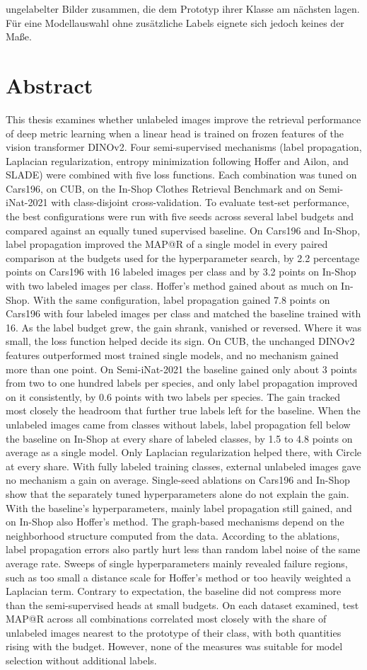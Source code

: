 ungelabelter Bilder zusammen, die dem Prototyp ihrer Klasse am nächsten lagen. Für eine Modellauswahl ohne zusätzliche Labels eignete sich jedoch keines der Maße.

\clearpage
\section*{Abstract}

This thesis examines whether unlabeled images improve the retrieval performance of deep metric learning when a linear head is trained on frozen features of the vision transformer DINOv2. Four semi-supervised mechanisms (label propagation, Laplacian regularization, entropy minimization following Hoffer and Ailon, and SLADE) were combined with five loss functions. Each combination was tuned on Cars196, on CUB, on the In-Shop Clothes Retrieval Benchmark and on Semi-iNat-2021 with class-disjoint cross-validation. To evaluate test-set performance, the best configurations were run with five seeds across several label budgets and compared against an equally tuned supervised baseline. On Cars196 and In-Shop, label propagation improved the MAP@R of a single model in every paired comparison at the budgets used for the hyperparameter search, by 2.2 percentage points on Cars196 with 16 labeled images per class and by 3.2 points on In-Shop with two labeled images per class. Hoffer's method gained about as much on In-Shop. With the same configuration, label propagation gained 7.8 points on Cars196 with four labeled images per class and matched the baseline trained with 16. As the label budget grew, the gain shrank, vanished or reversed. Where it was small, the loss function helped decide its sign. On CUB, the unchanged DINOv2 features outperformed most trained single models, and no mechanism gained more than one point. On Semi-iNat-2021 the baseline gained only about 3 points from two to one hundred labels per species, and only label propagation improved on it consistently, by 0.6 points with two labels per species. The gain tracked most closely the headroom that further true labels left for the baseline. When the unlabeled images came from classes without labels, label propagation fell below the baseline on In-Shop at every share of labeled classes, by 1.5 to 4.8 points on average as a single model. Only Laplacian regularization helped there, with Circle at every share. With fully labeled training classes, external unlabeled images gave no mechanism a gain on average. Single-seed ablations on Cars196 and In-Shop show that the separately tuned hyperparameters alone do not explain the gain. With the baseline's hyperparameters, mainly label propagation still gained, and on In-Shop also Hoffer's method. The graph-based mechanisms depend on the neighborhood structure computed from the data. According to the ablations, label propagation errors also partly hurt less than random label noise of the same average rate. Sweeps of single hyperparameters mainly revealed failure regions, such as too small a distance scale for Hoffer's method or too heavily weighted a Laplacian term. Contrary to expectation, the baseline did not compress more than the semi-supervised heads at small budgets. On each dataset examined, test MAP@R across all combinations correlated most closely with the share of unlabeled images nearest to the prototype of their class, with both quantities rising with the budget. However, none of the measures was suitable for model selection without additional labels.

